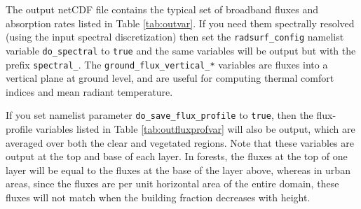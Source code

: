 \documentclass[a4,oneside]{article}
\def\codesize{\small}
\def\code#1{{\codesize\texttt{#1}}}
\begin{document}
The output netCDF file contains the typical set of broadband fluxes
and absorption rates listed in Table \ref{tab:outvar}. If you need
them spectrally resolved (using the input spectral discretization)
then set the \code{radsurf\_config} namelist variable
\code{do\_spectral} to \code{true} and the same variables will be
output but with the prefix \code{spectral\_}. The
\code{ground\_flux\_vertical\_*} variables are fluxes into a vertical
plane at ground level, and are useful for computing thermal comfort
indices and mean radiant temperature.

If you set namelist parameter \code{do\_save\_flux\_profile} to
\code{true}, then the flux-profile variables listed in Table
\ref{tab:outfluxprofvar} will also be output, which are averaged over
both the clear and vegetated regions. Note that these variables are
output at the top and base of each layer.  In forests, the fluxes at
the top of one layer will be equal to the fluxes at the base of the
layer above, whereas in urban areas, since the fluxes are per unit
horizontal area of the entire domain, these fluxes will not match when
the building fraction decreases with height.
\end{document}
